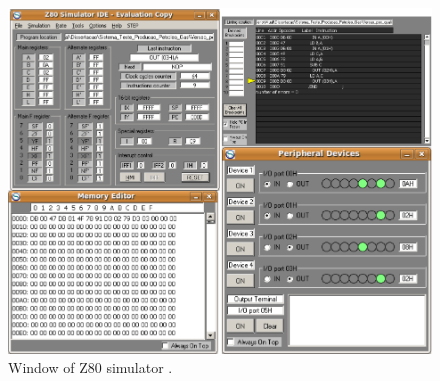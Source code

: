 \begin{figure}[ht]
\centering
\includegraphics[width=1.0\textwidth]{images/Simulator_Full.png}
\caption{Window of Z80 simulator \cite{Simulator_z80}.}
\label{fig:simulacao}
\end{figure}

